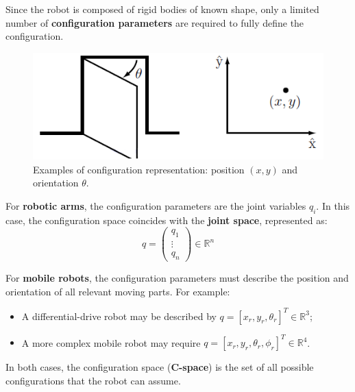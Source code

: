 Since the robot is composed of rigid bodies of known shape, only a limited number of \textbf{configuration parameters} are required to fully define the configuration.

\begin{figure}[H]
  \centering
  \includegraphics[width=0.55\linewidth]{imgs/configuration_space.png}
  \caption{Examples of configuration representation: position $(x, y)$ and orientation $\theta$.}
\end{figure}

For \textbf{robotic arms}, the configuration parameters are the joint variables $q_i$. In this case, the configuration space coincides with the \textbf{joint space}, represented as:
\[
q = 
\begin{pmatrix}
q_1 \\
\vdots \\
q_n
\end{pmatrix}
\in \mathbb{R}^n
\]

For \textbf{mobile robots}, the configuration parameters must describe the position and orientation of all relevant moving parts. For example:
\begin{itemize}
  \item A differential-drive robot may be described by $q = [x_r, y_r, \theta_r]^T \in \mathbb{R}^3$;
  \item A more complex mobile robot may require $q = [x_r, y_r, \theta_r, \phi_r]^T \in \mathbb{R}^4$.
\end{itemize}

In both cases, the configuration space (\textbf{C-space}) is the set of all possible configurations that the robot can assume.

